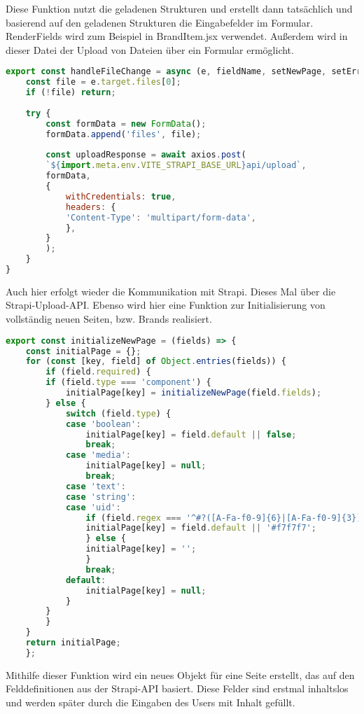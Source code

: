Diese Funktion nutzt die geladenen Strukturen und erstellt dann tatsächlich und basierend auf den geladenen Strukturen die Eingabefelder im Formular. RenderFields wird zum Beispiel in BrandItem.jsx verwendet.
Außerdem wird in dieser Datei der Upload von Dateien über ein Formular ermöglicht.

\begin{lstlisting}[language=JavaScript, caption={formutils.jsx Datei-Upload-Funktion}, label={lst:formutilsjsxDateiUpload}]
export const handleFileChange = async (e, fieldName, setNewPage, setError) => {
    const file = e.target.files[0];
    if (!file) return;
    
    try {
        const formData = new FormData();
        formData.append('files', file);
    
        const uploadResponse = await axios.post(
        `${import.meta.env.VITE_STRAPI_BASE_URL}api/upload`,
        formData,
        {
            withCredentials: true,
            headers: {
            'Content-Type': 'multipart/form-data',
            },
        }
        );
    }
}
\end{lstlisting}

Auch hier erfolgt wieder die Kommunikation mit Strapi. Dieses Mal über die Strapi-Upload-API.
Ebenso wird hier eine Funktion zur Initialisierung von vollständig neuen Seiten, bzw. Brands realisiert.

\begin{lstlisting}[language=JavaScript, caption={formutils.jsx Neue Seite initialisieren}, label={lst:formutilsjsxNeueSeite}]
export const initializeNewPage = (fields) => {
    const initialPage = {};
    for (const [key, field] of Object.entries(fields)) {
        if (field.required) {
        if (field.type === 'component') {
            initialPage[key] = initializeNewPage(field.fields);
        } else {
            switch (field.type) {
            case 'boolean':
                initialPage[key] = field.default || false;
                break;
            case 'media':
                initialPage[key] = null;
                break;
            case 'text':
            case 'string':
            case 'uid':
                if (field.regex === '^#?([A-Fa-f0-9]{6}|[A-Fa-f0-9]{3})$') {
                initialPage[key] = field.default || '#f7f7f7';
                } else {
                initialPage[key] = '';
                }
                break;
            default:
                initialPage[key] = null;
            }
        }
        }
    }
    return initialPage;
    };
\end{lstlisting}

Mithilfe dieser Funktion wird ein neues Objekt für eine Seite erstellt, das auf den Felddefinitionen aus der Strapi-API basiert. Diese Felder sind erstmal inhaltslos und werden später durch die Eingaben des Users mit Inhalt gefüllt.